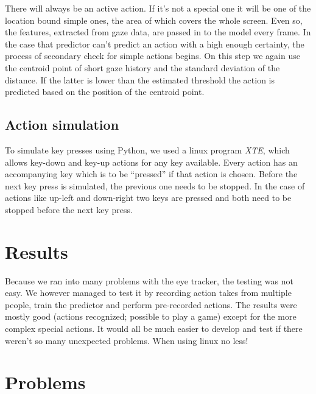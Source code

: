\documentclass[a4paper,11pt]{article}
\begin{document}
There will always be an active action. If it's not a special one it will be one of the location bound simple ones, the area of which covers the whole screen. Even so, the features, extracted from gaze data, are passed in to the model every frame. In the case that predictor can't predict an action with a high enough certainty, the process of secondary check for simple actions begins. On this step we again use the centroid point of short gaze history and the standard deviation of the distance. If the latter is lower than the estimated threshold the action is predicted based on the position of the centroid point.

\subsection{Action simulation}

To simulate key presses using Python, we used a linux program \emph{XTE}, which allows key-down and key-up actions for any key available. Every action has an accompanying key which is to be ``pressed'' if that action is chosen. Before the next key press is simulated, the previous one needs to be stopped. In the case of actions like up-left and down-right two keys are pressed and both need to be stopped before the next key press.

\section{Results}

Because we ran into many problems with the eye tracker, the testing was not easy. We however managed to test it by recording action takes from multiple people, train the predictor and perform pre-recorded actions. The results were mostly good (actions recognized; possible to play a game) except for the more complex special actions. It would all be much easier to develop and test if there weren't so many unexpected problems. When using linux no less!

\section{Problems}
\end{document}
